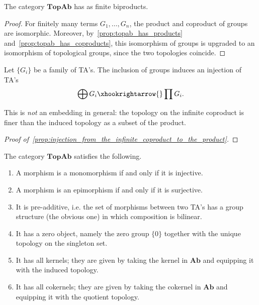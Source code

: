 \begin{corollary} The category $\textbf{TopAb}$ has as finite biproducts.
\end{corollary}
\begin{proof} For finitely many terms $G_1, \ldots, G_n$, the product and coproduct of groups are isomorphic. Moreover, by~\cref{prop:topab_has_products} and~\cref{prop:topab_has_coproducts}, this isomorphism of groups is upgraded to an isomorphism of topological groups, since the two topologies coincide.
\end{proof}

\begin{proposition}\label{prop:injection_from_the_infinite_coproduct_to_the_product} Let $\{G_i\}$ be a family of TA's. The inclusion of groups induces an injection of TA's \[\bigoplus G_i \xhookrightarrow{} \prod G_i.\]
\end{proposition}
\begin{remark} This is \emph{not} an embedding in general: the topology on the infinite coproduct is finer than the induced topology as a subset of the product.
\end{remark}
\begin{proof}[Proof of~\cref{prop:injection_from_the_infinite_coproduct_to_the_product}] \TODO
\end{proof}

\begin{proposition}\label{prop:topab_is_almost_abelian} The category $\textbf{TopAb}$ satisfies the following.
\begin{enumerate}
\item[(i)] A morphism is a monomorphism if and only if it is injective.
\item[(ii)] A morphism is an epimorphism if and only if it is surjective.
\item[(iii)] It is pre-additive, i.e. the set of morphisms between two TA's has a group structure (the obvious one) in which composition is bilinear.
\item[(iv)] It has a zero object, namely the zero group $\{0\}$ together with the unique topology on the singleton set.
\item[(v)] It has all kernels; they are given by taking the kernel in $\textbf{Ab}$ and equipping it with the induced topology.
\item[(vi)] It has all cokernels; they are given by taking the cokernel in $\textbf{Ab}$ and equipping it with the quotient topology.
\end{enumerate}
\end{proposition}

